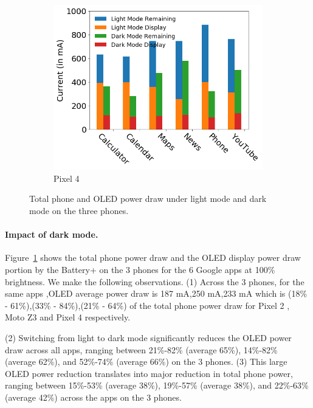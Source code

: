 \begin{figure}[]
\begin{subfigure}[]{0.32\textwidth}
		\includegraphics[width=\textwidth]{figure/004_Pixel4_case_study.png}
        \vspace{-0.2in}
		\caption{Pixel 4}
	\end{subfigure}
        \vspace{-0.15in}
	\caption{Total phone and OLED power draw under light mode and dark mode
 on the three phones.}
        \vspace{-0.10in}
	\label{fig:apps_expriment}
\end{figure}

\paragraph{Impact of dark mode.}

Figure~\ref{fig:apps_expriment} shows the total phone power draw and the  OLED display power draw  portion by the Battery+ %
on the 3 phones for the 6 Google apps   at 100\% brightness.
We make the following observations.
(1) Across the 3 phones,
for the same apps ,OLED average power draw is 187 mA,250 mA,233 mA which is (18\% - 61\%),(33\% - 84\%),(21\% - 64\%) of the total phone power draw for
Pixel 2  , Moto Z3  and Pixel 4 respectively.

%
(2) Switching from light to dark mode significantly
reduces the OLED power draw across all apps, ranging
between 21\%-82\% (average 65\%), 14\%-82\% (average 62\%), and 52\%-74\%  (average 66\%)
on the 3 phones. 
(3) This large OLED power reduction translates into
major reduction in total phone power,
ranging between 15\%-53\% (average 38\%), 19\%-57\% (average 38\%), and 22\%-63\%  (average 42\%)
across the apps on the 3 phones.

